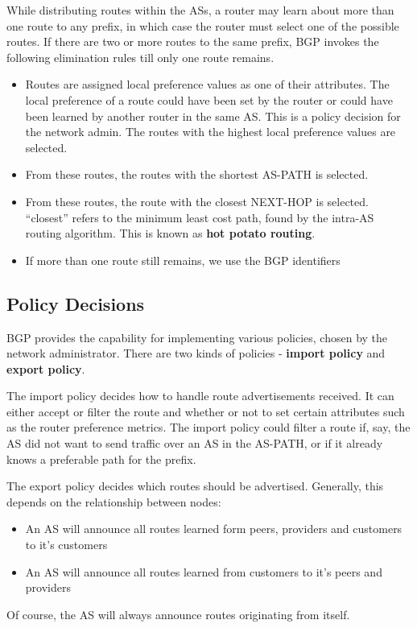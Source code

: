 \documentclass[12pt,letterpaper]{book}
\theoremstyle{definition}
\begin{document}
While distributing routes within the ASs, a router may learn about more than one route to any prefix, in which case the router must select one of the possible routes. If there are two or more routes to the same prefix, BGP invokes the following elimination rules till only one route remains.

\begin{itemize}
  \item Routes are assigned local preference values as one of their attributes. The local preference of a route could have been set by the router or could have been learned by another router in the same AS. This is a policy decision for the network admin. The routes with the highest local preference values are selected.
  \item From these routes, the routes with the shortest AS-PATH is selected.
  \item From these routes, the route with the closest NEXT-HOP is selected. ``closest'' refers to the minimum least cost path, found by the intra-AS routing algorithm. This is known as \textbf{hot potato routing}.
  \item If more than one route still remains, we use the BGP identifiers
\end{itemize}

\subsection{Policy Decisions}

BGP provides the capability for implementing various policies, chosen by the network administrator. There are two kinds of policies - \textbf{import policy} and \textbf{export policy}.

The import policy decides how to handle route advertisements received. It can either accept or filter the route and whether or not to set certain attributes such as the router preference metrics. The import policy could filter a route if, say, the AS did not want to send traffic over an AS in the AS-PATH, or if it already knows a preferable path for the prefix.

The export policy decides which routes should be advertised. Generally, this depends on the relationship between nodes:
\begin{itemize}
  \item An AS will announce all routes learned form peers, providers and customers to it's customers
  \item An AS will announce all routes learned from customers to it's peers and providers
\end{itemize} 
Of course, the AS will always announce routes originating from itself.
\end{document}

